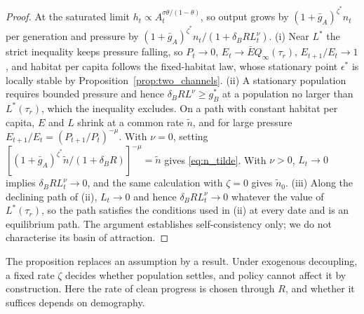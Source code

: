 \documentclass[11pt]{article}
\begin{document}
\begin{proof}
At the saturated limit $h_t\propto A_t^{\sigma\theta/(1-\theta)}$, so output grows by
$(1+\bar g_A)^{\zeta^\ast}n_t$ per generation and pressure by
$(1+\bar g_A)^{\zeta^\ast}n_t/(1+\delta_BRL_t^{\nu})$. (i) Near $L^\ast$ the strict inequality keeps
pressure falling, so $P_t\to0$, $E_t\to\bar EQ_\infty(\tau_r)$, $E_{t+1}/E_t\to1$, and habitat per capita
follows the fixed-habitat law, whose stationary point $\epsilon^\ast$ is locally stable by
Proposition~\ref{prop:two_channels}. (ii) A stationary population requires bounded pressure and hence
$\delta_BRL^{\nu}\ge g_B^\ast$ at a population no larger than $L^\ast(\tau_r)$, which the inequality
excludes. On a path with constant habitat per capita, $E$ and $L$ shrink at a common rate $\tilde n$,
and for large pressure $E_{t+1}/E_t=(P_{t+1}/P_t)^{-\mu}$. With $\nu=0$, setting
$[(1+\bar g_A)^{\zeta^\ast}\tilde n/(1+\delta_BR)]^{-\mu}=\tilde n$ gives \eqref{eq:n_tilde}. With
$\nu>0$, $L_t\to0$ implies $\delta_BRL_t^{\nu}\to0$, and the same calculation with $\zeta=0$ gives
$\tilde n_0$. (iii) Along the declining path of (ii), $L_t\to0$ and hence $\delta_BRL_t^{\nu}\to0$ whatever
the value of $L^\ast(\tau_r)$, so the path satisfies the conditions used in (ii) at every date and is an
equilibrium path. The argument establishes self-consistency only; we do not characterise its basin of
attraction.
\end{proof}

The proposition replaces an assumption by a result. Under exogenous decoupling, a fixed rate $\zeta$
decides whether population settles, and policy cannot affect it by construction. Here the
rate of clean progress is chosen through $R$, and whether it suffices depends on demography.
\end{document}
